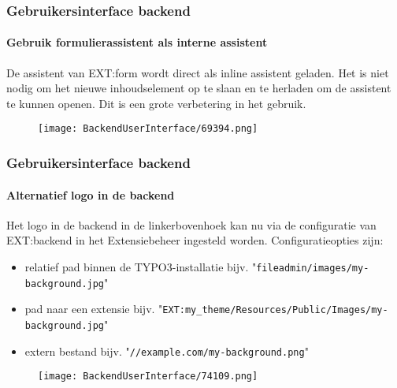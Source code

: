 \begin{frame}[fragile]
	\frametitle{Gebruikersinterface backend}
	\framesubtitle{Gebruik formulierassistent als interne assistent}

	De assistent van EXT:form wordt direct als inline assistent geladen.
	Het is niet nodig om het nieuwe inhoudselement op te slaan en te herladen
	om de assistent te kunnen openen. Dit is een grote verbetering in het gebruik.

	\begin{figure}
		\texttt{[image: BackendUserInterface/69394.png]}
	\end{figure}

\end{frame}

\begin{frame}[fragile]
	\frametitle{Gebruikersinterface backend}
	\framesubtitle{Alternatief logo in de backend}

	Het logo in de backend in de linkerbovenhoek kan nu via de configuratie van
	EXT:backend in het Extensiebeheer ingesteld worden.\newline
	Configuratieopties zijn:

	\begin{itemize}
		\item relatief pad binnen de TYPO3-installatie\newline
			\smaller
				bijv. "\texttt{fileadmin/images/my-background.jpg}"
			\normalsize

		\item pad naar een extensie\newline
			\smaller
				bijv. "\texttt{EXT:my\_theme/Resources/Public/Images/my-background.jpg}"
			\normalsize

		\item extern bestand\newline
			\smaller
				bijv. "\texttt{//example.com/my-background.png}"
			\normalsize

	\end{itemize}

	\begin{figure}
		\texttt{[image: BackendUserInterface/74109.png]}
	\end{figure}

\end{frame}

